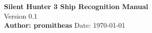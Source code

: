 \documentclass[12pt]{article}
\begin{document}
\begin{titlepage}
    \centering
    \vspace*{2cm}
    \Huge
    \textbf{Silent Hunter 3 Ship Recognition Manual}
	\\
    \LARGE
	Version 0.1
	\\
    \textbf{Author: promitheas}
    \vfill
    \Large
    Date: \today
    \vspace{0.8cm}
\end{titlepage}

\newcommand{\shipinfo}[7]{
	\begin{center}
		\texttt{[image: \#1]} %
		\vspace{10pt}
		\\
		\begingroup
			\fontsize{14pt}{12pt}
				\textbf{Ship Name:} #2 \quad
				\textbf{ClassName:} #3 \quad
				\textbf{MaxSpeed:} #4 kt \quad
				\textbf{Length:} #5 m \quad
				\textbf{Width:} #6 m \quad
				\textbf{Mast:} #7 m \\
		\endgroup
	\end{center}
	\newpage
	}

\end{document}

